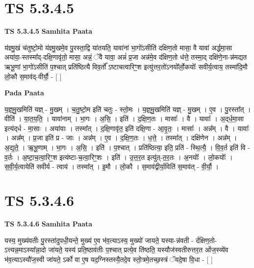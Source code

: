 \documentclass[17pt]{extarticle}
\begin{document}
\section*{ TS 5.3.4.5 }

\textbf{TS 5.3.4.5 } \newline
\textbf{Samhita Paata} \newline

य॑ज्ञ्मु॒खं च॑तुष्टो॒मो य॑ज्ञ्मु॒खमे॒व पु॒रस्ता॒द्वि या॑तयति॒ यावा॑नां भा॒गो॑ऽसीति॑ दक्षिण॒तो मासा॒ वै यावा॑ अर्द्धमा॒सा अया॑वा॒-स्तस्मा᳚द्-दक्षि॒णावृ॑तो॒ मासा॒ अन्नं॒ ॅवै यावा॒ अन्नं॑ प्र॒जा अन्न॑मे॒व द॑क्षिण॒तो ध॑त्ते॒ तस्मा॒द् दक्षि॑णे॒ना-न्न॑मद्यत ऋभू॒णां भा॒गो॑ऽसीति॑ प॒श्चात् प्रति॑ष्ठित्यै विव॒र्तो᳚ ऽष्टाचत्वारिꣳ॒॒श इत्यु॑त्तर॒तो॑ऽनयो᳚र्लो॒कयोः᳚ सवीर्य॒त्वाय॒ तस्मा॑दि॒मौ लो॒कौ स॒माव॑द्-वीर्यौ॒ - [  ] \newline

\textbf{Pada Paata} \newline

य॒ज्ञ्॒मु॒खमिति॑ यज्ञ् - मु॒खम् । च॒तु॒ष्टो॒म इति॑ चतुः - स्तो॒मः । य॒ज्ञ्॒मु॒खमिति॑ यज्ञ् - मु॒खम् । ए॒व । पु॒रस्ता᳚त् । वीति॑ । या॒त॒य॒ति॒ । यावा॑नाम् । भा॒गः । अ॒सि॒ । इति॑ । द॒क्षि॒ण॒तः । मासाः᳚ । वै । यावाः᳚ । अ॒द्‌र्ध॒मा॒सा इत्य॑द्‌र्ध - मा॒साः । अया॑वाः । तस्मा᳚त् । द॒क्षि॒णावृ॑त॒ इति॑ दक्षि॒णा - आ॒वृ॒तः॒ । मासाः᳚ । अन्न᳚म् । वै । यावाः᳚ । अन्न᳚म् । प्र॒जा इति॑ प्र - जाः । अन्न᳚म् । ए॒व । द॒क्षि॒ण॒तः । ध॒त्ते॒ । तस्मा᳚त् । दक्षि॑णेन । अन्न᳚म् । अ॒द्य॒ते॒ । ऋ॒भू॒णाम् । भा॒गः । अ॒सि॒ । इति॑ । प॒श्चात् । प्रति॑ष्ठित्या॒ इति॒ प्रति॑ - स्थि॒त्यै॒ । वि॒व॒र्त इति॑ वि - व॒र्तः । अ॒ष्टा॒च॒त्वा॒रिꣳ॒॒श इत्य॑ष्टा-च॒त्वा॒रिꣳ॒॒शः । इति॑ । उ॒त्त॒र॒त इत्यु॑त्-त॒र॒तः । अ॒नयोः᳚ । लो॒कयोः᳚ । स॒वी॒र्य॒त्वायेति॑ सवीर्य - त्वाय॑ । तस्मा᳚त् । इ॒मौ । लो॒कौ । स॒माव॑द्वीर्या॒विति॑ स॒माव॑त् - वी॒र्यौ॒ ।  \newline




\section*{ TS 5.3.4.6 }

\textbf{TS 5.3.4.6 } \newline
\textbf{Samhita Paata} \newline

यस्य॒ मुख्य॑वतीः पु॒रस्ता॑दुपधी॒यन्ते॒ मुख्य॑ ए॒व भ॑व॒त्याऽस्य॒ मुख्यो॑ जायते॒ यस्या-न्न॑वती - र्दक्षिण॒तो-ऽत्त्यन्न॒माऽस्या᳚न्ना॒दो जा॑यते॒ यस्य॑ प्रति॒ष्ठाव॑तीः प॒श्चात् प्रत्ये॒व ति॑ष्ठति॒ यस्यौज॑स्वतीरुत्तर॒त ओ॑ज॒स्व्ये॑व भ॑व॒त्याऽस्यौ॑ज॒स्वी जा॑यते॒ ऽर्को वा ए॒ष यद॒ग्निस्तस्यै॒तदे॒व स्तो॒त्रमे॒तच्छ॒स्त्रं ॅयदे॒षा वि॒धा - [  ] \newline
\end{document}
